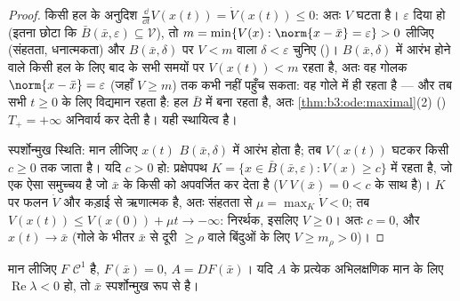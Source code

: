 \begin{proof}
किसी हल के अनुदिश $\frac{\dd}{\dd t}V(x(t)) = \dot V(x(t))
\leq 0$: अतः $V$ घटता है। $\varepsilon$ दिया हो (इतना
छोटा कि $\bar B(\bar x, \varepsilon) \subseteq \mathcal V$), तो
$m = \min\{V(x) : \norm{x - \bar x} = \varepsilon\} > 0$
लीजिए (संहतता, धनात्मकता) और $B(\bar x, \delta)$ पर $V < m$ वाला $\delta < \varepsilon$ चुनिए
()। $B(\bar x, \delta)$ में आरंभ होने वाले किसी हल के लिए बाद के सभी
समयों पर $V(x(t)) < m$ रहता है, अतः वह गोलक $\norm{x -
\bar x} = \varepsilon$ (जहाँ $V \geq m$) तक कभी
नहीं पहुँच सकता: वह गोले में ही रहता है --- और तब सभी $t \geq 0$ के
लिए विद्यमान रहता है: हल  $\bar B$ में बना रहता है, अतः \cref{thm:b3:ode:maximal}(2)
() $T_+ = +\infty$ अनिवार्य कर देती है। यही स्थायित्व है।

स्पर्शोन्मुख स्थिति: मान लीजिए $x(t)$ $B(\bar x, \delta)$ में आरंभ होता है; तब
$V(x(t))$ घटकर किसी $c \geq 0$ तक जाता है। यदि $c > 0$ हो: प्रक्षेपपथ $K = \{x \in \bar B(\bar x,
\varepsilon): V(x) \geq c\}$
में रहता है, जो एक ऐसा  समुच्चय है जो $\bar x$ के किसी 
को अपवर्जित कर देता है ($V$ $V(\bar x)
= 0 < c$ के साथ  है)। $K$ पर फलन
$\dot V$  और कड़ाई से ऋणात्मक है, अतः संहतता से $\mu = \max_K\dot V < 0$; तब $V(x(t)) \leq V(x(0)) + \mu t \to
-\infty$:
निरर्थक, इसलिए $V \geq 0$। अतः $c = 0$, और $x(t) \to \bar x$ (गोले के भीतर $\bar x$ से
दूरी $\geq
\rho$ वाले बिंदुओं के लिए $V \geq m_\rho >
0$)।
\end{proof}

\begin{theorem}[रैखिकीकरण से स्थायित्व]
\label{thm:b3:ode:linearization}
मान लीजिए $F$ $\mathcal C^1$ है, $F(\bar x) = 0$, $A = DF(\bar x)$। यदि $A$ के प्रत्येक
अभिलक्षणिक मान के लिए $\operatorname{Re}\lambda <
0$ हो, तो $\bar x$ स्पर्शोन्मुख रूप से
 है।
\end{theorem}

